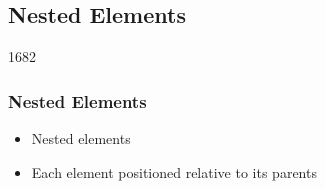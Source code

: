 %
%
%
%

\subsection{Nested Elements}


\begin{slide}{1682}\frametitle{Nested Elements}


\begin{itemize}
\item Nested  elements
\item Each element positioned relative to its parents
\end{itemize}                           


\end{slide}                                                              

